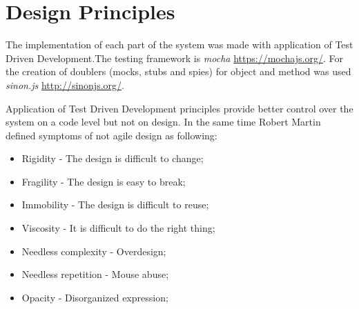 \chapter{Design Principles}
\label{chap:design}
The implementation of each part of the system was made with application of Test Driven Development.The testing framework is \textit{mocha} \url{https://mochajs.org/}. For the creation of doublers (mocks, stubs and spies) for object and method was used \textit{sinon.js }\url{http://sinonjs.org/}.

Application of Test Driven Development principles provide better control over the system on a code level but not on design. In the same time Robert Martin \cite{MartinASD} defined symptoms of not agile design as following:
\begin{itemize}
	\item Rigidity - The design is difficult to change;
	\item Fragility - The design is easy to break;
	\item Immobility - The design is difficult to reuse;
	\item Viscosity - It is difficult to do the right thing;
	\item Needless complexity - Overdesign;
	\item Needless repetition - Mouse abuse;
	\item Opacity - Disorganized expression;
\end{itemize}


